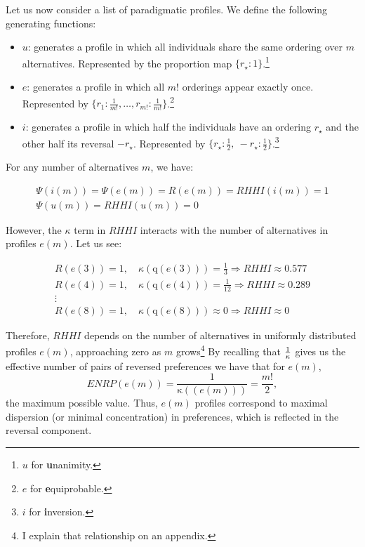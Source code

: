 \documentclass[12pt]{article}
\begin{document}
Let us now consider a list of paradigmatic profiles. We define the following generating functions:

\begin{itemize}
  \item \( u \): generates a profile in which all individuals share the same ordering over \( m \) alternatives. Represented by the proportion map \( \{ r_{\star} : 1 \} \).\footnote{\( u \) for \textbf{u}nanimity.}
  \item \( e \): generates a profile in which all \( m! \) orderings appear exactly once. Represented by \( \{ r_1 : \tfrac{1}{m!}, \ldots, r_{m!} : \tfrac{1}{m!} \} \).\footnote{\( e \) for \textbf{e}quiprobable.}
  \item \( i \): generates a profile in which half the individuals have an ordering \( r_{\star} \) and the other half its reversal \( -r_{\star} \). Represented by \( \{ r_{\star} : \tfrac{1}{2},\ -r_{\star} : \tfrac{1}{2} \} \).\footnote{\( i \) for \textbf{i}nversion.}
\end{itemize}

For any number of alternatives \( m \), we have:

\begin{align}
  \Psi(i(m)) = \Psi(e(m)) = R(e(m)) = RHHI(i(m)) = 1 \\
  \Psi(u(m)) = RHHI(u(m)) = 0
\end{align}

However, the \( \kappa \) term in \( RHHI \) interacts with the number of alternatives in profiles \( e(m) \). Let us see:

\begin{align}
  R(e(3)) = 1, \quad \kappa(\text{q}(e(3))) = \tfrac{1}{3} \Rightarrow RHHI \approx 0.577 \\
  R(e(4)) = 1, \quad \kappa(\text{q}(e(4))) = \tfrac{1}{12} \Rightarrow RHHI \approx 0.289 \\
  \vdots \\
  R(e(8)) = 1, \quad \kappa(\text{q}(e(8))) \approx 0 \Rightarrow RHHI \approx 0
\end{align}

Therefore, \( RHHI \) depends on the number of alternatives in uniformly
distributed profiles \( e(m) \), approaching zero as \( m \) grows\footnote{ I explain that relationship on an appendix. }
By recalling that \({1 \over \kappa}\) gives us the effective number of pairs of reversed preferences we have that for  \(e(m)\),
\[
ENRP(e(m)) = \frac{1}{\mathrm{\kappa}((e(m)))} = \frac{m!}{2},
\]
the maximum possible value. Thus, \(e(m)\) profiles correspond to maximal dispersion (or minimal concentration) in preferences, which is reflected in the reversal component. 
\end{document}
